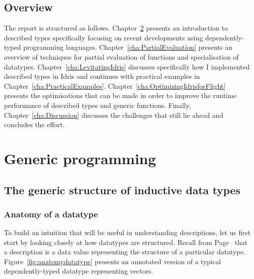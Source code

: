 \documentclass{ituthesis}
\theoremstyle{break}
\begin{document}
\section{Overview}
\label{sec:Overview}

The report is structured as follows. Chapter~\ref{cha:GenericProgramming} presents an introduction to described types specifically focusing on recent developments using dependently-typed programming languages.
Chapter~\ref{cha:PartialEvaluation} presents an overview of techniques for partial evaluation of functions and specialisation of datatypes. Chapter~\ref{cha:LevitatingIdris} discusses specifically how I implemented described types in Idris and continues with practical examples in Chapter~\ref{cha:PracticalExamples}.
Chapter~\ref{cha:OptimizingIdrisforFlight} presents the optimisations that can be made in order to improve the runtime performance of described types and generic functions.
Finally, Chapter~\ref{cha:Discussion} discusses the challenges that still lie ahead and concludes the effort.
\chapter{Generic programming}
\label{cha:GenericProgramming}
\section{The generic structure of inductive data types}
\label{sec:TheGenericStructureofInductiveDataTypes}
\subsection{Anatomy of a datatype}
\label{sub:AnatomyofaDatatype}
To build an intuition that will be useful in understanding descriptions, let us first start by looking closely at how datatypes are structured.
Recall from Page~\pageref{kw:desc} that a description is a data value representing the structure of a particular datatype.
Figure~\ref{fig:anatomydatatype} presents an annotated version of a typical dependently-typed datatype representing vectors.
\end{document}
